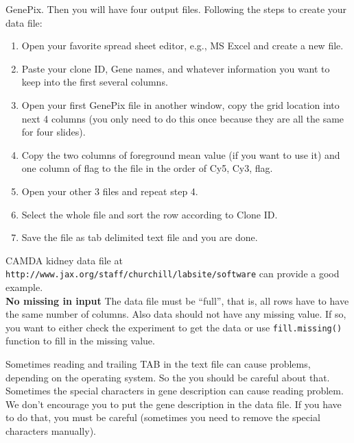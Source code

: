 GenePix. Then you will have four output files. Following the steps to create your data file:
\begin{enumerate}
\item Open your favorite spread sheet editor, e.g., MS Excel and 
create a new file.
\item Paste your clone ID, Gene names, and whatever
information you want to keep into the first several columns.
\item Open your first GenePix file in another window, 
copy the grid location into next 4 columns (you only need to do this once
because they are all the same for four slides).
\item Copy the two columns of foreground mean value (if you want to use it)
and one column of flag to the file in the order of Cy5, Cy3, flag.
\item Open your other 3 files and repeat step 4.
\item Select the whole file and sort the row according to Clone ID.
\item Save the file as tab delimited text file and you are done. 
\end{enumerate}
CAMDA kidney data file at {\tt
http://www.jax.org/staff/churchill/labsite/software} can provide a good example.\\
{\bf No missing in input} The data file must be ``full'', that is, all rows
have to have the same number of columns. Also data should not have any missing
value. If so, you want to either check the experiment to get the data or
use {\tt fill.missing()} function to fill in the missing value. 

Sometimes reading and trailing TAB in the text file can cause
problems, depending on the operating system. So the you should be careful
about that. Sometimes the special characters in gene description can
cause reading problem. We don't encourage you to put the gene description
in the data file. If you have to do that, you must be careful (sometimes
you need to remove the special characters manually).
